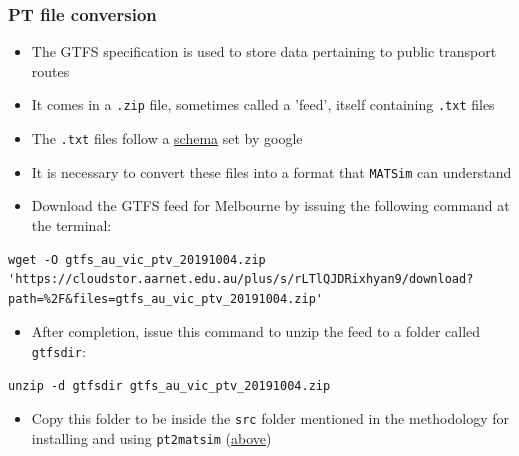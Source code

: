 \documentclass[11pt]{article}
\begin{document}
\subsubsection{PT file conversion}
\label{sec:org6d49969}
\begin{itemize}
\item The GTFS specification is used to store data pertaining to public transport routes
\item It comes in a \texttt{.zip} file, sometimes called a 'feed', itself containing \texttt{.txt} files
\item The \texttt{.txt} files follow a \href{https://developers.google.com/transit/gtfs/reference}{schema} set by google
\item It is necessary to convert these files into a format that \texttt{MATSim} can understand
\item Download the GTFS feed for Melbourne by issuing the following command at the terminal:
\end{itemize}
\begin{verbatim}
wget -O gtfs_au_vic_ptv_20191004.zip 'https://cloudstor.aarnet.edu.au/plus/s/rLTlQJDRixhyan9/download?path=%2F&files=gtfs_au_vic_ptv_20191004.zip'
\end{verbatim}

\begin{itemize}
\item After completion, issue this command to unzip the feed to a folder called \texttt{gtfsdir}:
\end{itemize}
\begin{verbatim}
unzip -d gtfsdir gtfs_au_vic_ptv_20191004.zip
\end{verbatim}

\begin{itemize}
\item Copy this folder to be inside the \texttt{src} folder mentioned in the methodology for installing and using \texttt{pt2matsim} (\hyperref[sec:org3a355d7]{above})
\end{itemize}
\end{document}
